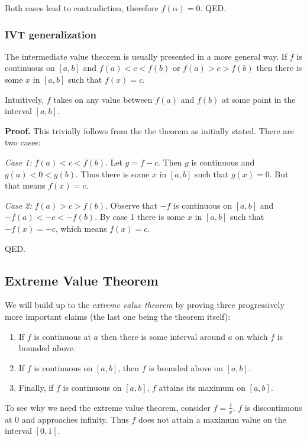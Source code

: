 \vs

Both cases lead to contradiction, therefore $f(\alpha)=0$. QED.

\subsubsection*{IVT generalization}

The intermediate value theorem is usually presented in a more
general way. If $f$ is continuous on $[a,b]$ and $f(a)<c<f(b)$ or
$f(a)>c>f(b)$ then there is some $x$ in $[a,b]$ such that $f(x)=c$.

\vs

Intuitively, $f$ takes on any value between $f(a)$ and $f(b)$ at some
point in the interval $[a,b]$.

\vs

\textbf{Proof.} This trivially follows from the the theorem as
initially stated. There are two cases:

\vs

\textit{Case 1:} $f(a)<c<f(b)$. Let $g=f-c$. Then $g$ is continuous
and $g(a)<0<g(b)$. Thus there is some $x$ in $[a,b]$ such that
$g(x)=0$. But that means $f(x)=c$.

\vs

\textit{Case 2:} $f(a)>c>f(b)$. Observe that $-f$ is continuous on
$[a,b]$ and $-f(a)<-c<-f(b)$. By case 1 there is some $x$ in $[a,b]$
such that $-f(x)=-c$, which means $f(x)=c$.

\vs

QED.

\subsection{Extreme Value Theorem}
We will build up to the \textit{extreme value theorem} by proving
three progressively more important claims (the last one being the
theorem itself):
\begin{enumerate}
\item If $f$ is continuous at $a$ then there is some interval around
  $a$ on which $f$ is bounded above.
\item If $f$ is continuous on $[a,b]$, then $f$ is bounded above on
  $[a,b]$.
\item Finally, if $f$ is continuous on $[a,b]$, $f$ attains its
  maximum on $[a,b]$.
\end{enumerate}

To see why we need the extreme value theorem, consider
$f=\frac{1}{x}$. $f$ is discontinuous at $0$ and approaches infinity.
Thus $f$ does not attain a maximum value on the interval $[0,1]$.

